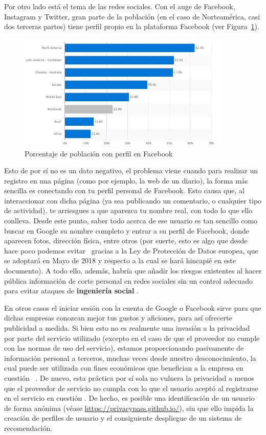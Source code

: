 Por otro lado está el tema de las redes sociales. Con el auge de
Facebook, Instagram y Twitter, gran parte de la población (en el caso
de Norteamérica, casi dos terceras partes) tiene perfil propio en la
plataforma Facebook (ver Figura~\ref{fig:FBStats}).
\begin{figure}[!hbtp]
	\centerline{
		\mbox{\includegraphics[width=4.00in]{images/sn.png}}
	}
	\caption{Porcentaje de población con perfil en Facebook~\cite{article:FacebookStats} }
	\label{fig:FBStats}
\end{figure}
Esto de por sí no es un dato negativo, el problema viene cuando para
realizar un registro en una página (como por ejemplo, la web de un
diario), la forma más sencilla es conectando con tu perfil personal de
Facebook. Esto causa que, al interaccionar con dicha página (ya sea
publicando un comentario, o cualquier tipo de actividad), te
arriesgues a que aparezca tu nombre real, con todo lo que ello
conlleva. Desde este punto, saber todo acerca de ese usuario es tan
sencillo como buscar en Google su nombre completo y entrar a su perfil
de Facebook, donde aparecen fotos, dirección física, entre otros (por
suerte, esto es algo que desde hace poco podemos
evitar~\cite{article:GDPRGoogle} gracias a la
Ley de Protección de Datos europea, que se adoptará en Mayo de 2018 y respecto a la cual se hará hincapié en este
documento). A todo ello, además, habría que añadir los riesgos
existentes al hacer pública información de corte personal en redes
sociales sin un control adecuado para evitar ataques de \textbf{ingeniería
social} \cite{backstrom2007wherefore,hadnagy2010social}.


En otros casos el iniciar sesión con la cuenta de Google o Facebook
sirve para que dichas empresas conozcan mejor tus gustos y aficiones,
para así ofrecerte publicidad a medida. Si bien esto no es realmente
una invasión a la privacidad por parte del servicio utilizado (excepto
en el caso de que el proveedor no cumple con las normas de uso del
servicio), estamos proporcionando pasivamente de información personal
a terceros, muchas veces desde nuestro desconocimiento, la cual puede
ser utilizada con fines económicos que benefician a la empresa en
cuestión ~\cite{article:compraventa}. De nuevo, esta práctica por sí
sola no vulnera la privacidad a menos que el proveedor de servicio no
cumpla con lo que el usuario aceptó al registrarse en el servicio en
cuestión \cite{diaz2015privacy}. De hecho, es posible una
identificación de un usuario de forma anónima (véase
\url{https://privacypass.github.io/}), sin que ello impida la creación
de perfiles de usuario y el consiguiente despliegue de un sistema de
recomendación.



